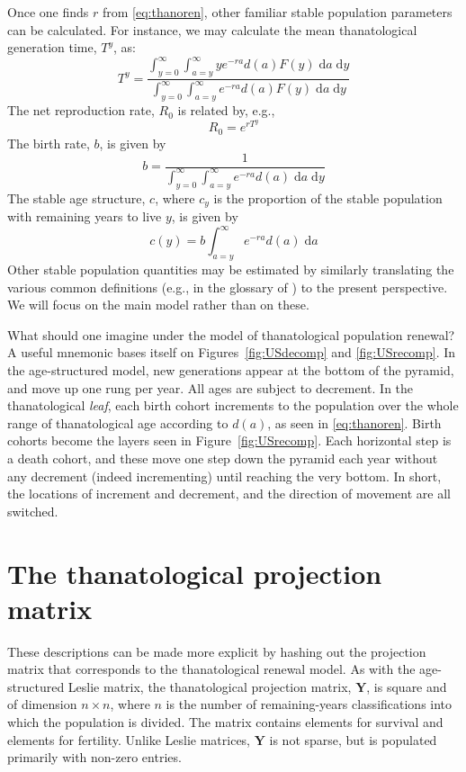 \documentclass{article}
\newcommand{\dd}{\; \mathrm{d}}
\begin{document}
Once one finds $r$ from \eqref{eq:thanoren}, other familiar stable population
parameters can be calculated. For instance, we may calculate the mean
thanatological generation time, $T^y$, as:
\begin{equation}
\label{eq:Ty}
 T^y =  \frac{\int _{y=0}^\infty \int _{a=y}^\infty y e^{-ra} d(a) F(y) \dd a
\dd y}{\int _{y=0}^\infty \int _{a=y}^\infty e^{-ra} d(a) F(y) \dd a \dd y}
\end{equation}
The net reproduction rate, $R_0$ is related by, e.g.,
\begin{equation}
\label{eq:R0fromTy}
R_0 = e^{r T^y}
\end{equation}
The birth rate, $b$, is given by
\begin{equation}
\label{eq:eybrate}
b = \frac{1}{\int _{y=0}^\infty \int _{a=y}^\infty e^{-ra} d(a) \dd a
\dd y}
\end{equation}
The stable age structure, $c$, where $c_y$ is the
proportion of the stable population with remaining years to live $y$, is given
by
\begin{equation}
\label{eq:cy}
c(y) = b \int _{a=y}^\infty e^{-ra} d(a) \dd a
\end{equation}
Other stable population quantities may be estimated by similarly translating the
various common definitions (e.g., in the glossary of \citet{coale1972growth}) to
the present perspective. We will focus on the main model rather than on these.

What should one imagine under the model of thanatological population renewal? A
useful mnemonic bases itself on Figures~\ref{fig:USdecomp} and
\ref{fig:USrecomp}. In the age-structured model, new generations
appear at the bottom of the pyramid, and move up one rung per year. All ages are subject to decrement. In the thanatological \textit{leaf}, each birth cohort increments to
the population over the whole range of thanatological age according to $d(a)$,
as seen in \eqref{eq:thanoren}. Birth cohorts become the layers seen in
Figure~\ref{fig:USrecomp}. Each horizontal step is a death cohort, and these
move one step down the pyramid each year without any decrement (indeed
incrementing) until reaching the very bottom. In short, the locations of
increment and decrement, and the direction of movement are all switched.

\section*{The thanatological projection matrix}
These descriptions can be made more explicit by hashing out the projection
matrix that corresponds to the thanatological renewal model. As with the
age-structured Leslie matrix, the thanatological projection matrix,
$\textbf{Y}$, is square and of dimension $n \times n$, where $n$ is the number
of remaining-years classifications into which the population is divided. 
The matrix contains elements for survival and elements for fertility. Unlike
Leslie matrices, $\textbf{Y}$ is not sparse, but is populated primarily with non-zero entries.
\end{document}
